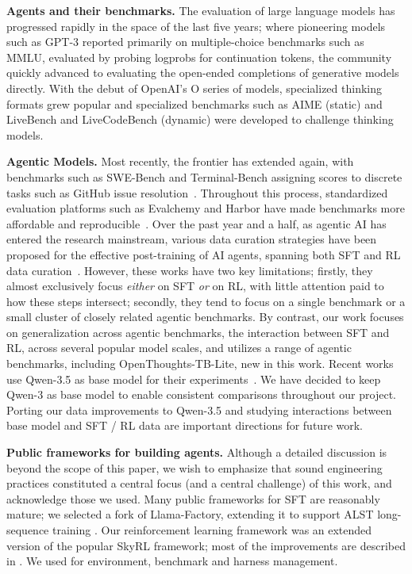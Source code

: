 \documentclass{llmxive}
\begin{document}
\textbf{Agents and their benchmarks.} The evaluation of large language models has progressed rapidly in the space of the last five years; where pioneering models such as GPT-3 reported primarily on multiple-choice benchmarks such as MMLU, evaluated by probing logprobs for continuation tokens, the community quickly advanced to evaluating the open-ended completions of generative models directly. With the debut of OpenAI's O series of models, specialized thinking formats grew popular and specialized benchmarks such as AIME (static) and LiveBench and LiveCodeBench (dynamic) were developed to challenge thinking models.

\textbf{Agentic Models.} Most recently, the frontier has extended again, with benchmarks such as SWE-Bench and Terminal-Bench assigning scores to discrete tasks such as GitHub issue resolution~\citep{ merrill2026terminalbenchbenchmarkingagentshard, jimenez2024swebenchlanguagemodelsresolve}. Throughout this process, standardized evaluation platforms such as Evalchemy and Harbor have made benchmarks more affordable and reproducible~\citep{Harbor_Framework, evalchemy}. Over the past year and a half, as agentic AI has entered the research mainstream, various data curation strategies have been proposed for the effective post-training of AI agents, spanning both SFT and RL data curation~\citep{yang2025swesmithscalingdatasoftware, gandhi2026endlessterminalsscalingrl, pi2026dataengineeringscalingllm, shen2026serasoftverifiedefficientrepository, zeng2026davincidevagentnativemidtrainingsoftware, deepswe2025, cao2025skyrlagentefficientrltraining}. 
However, these works have two key limitations; firstly, they almost exclusively focus \textit{either} on SFT \textit{or} on RL, with little attention paid to how these steps intersect; secondly, they tend to focus on a single benchmark or a small cluster of closely related agentic benchmarks.
By contrast, our work focuses on generalization across agentic benchmarks, the interaction between SFT and RL, across several popular model scales, and utilizes a range of agentic benchmarks, including OpenThoughts-TB-Lite, new in this work. Recent works use Qwen-3.5 as base model for their experiments~\citep{ivison2026tmaxsimplerecipeterminal}. We have decided to keep Qwen-3 as base model to enable consistent comparisons throughout our project. Porting our data improvements to Qwen-3.5 and studying interactions between base model and SFT / RL data are important directions for future work.

\textbf{Public frameworks for building agents.} Although a detailed discussion is beyond the scope of this paper, we wish to emphasize that sound engineering practices constituted a central focus (and a central challenge) of this work, and acknowledge those we used. Many public frameworks for SFT are reasonably mature; we selected a fork of Llama-Factory, extending it to support ALST long-sequence training \citep{zheng-etal-2024-llamafactory,bekman2025arcticlongsequencetraining}. Our reinforcement learning framework was an extended version of the popular SkyRL framework; most of the improvements are described in \cite{novasky2026skyrlharbor}. We used \cite{Harbor_Framework} for environment, benchmark and harness management.
\end{document}
